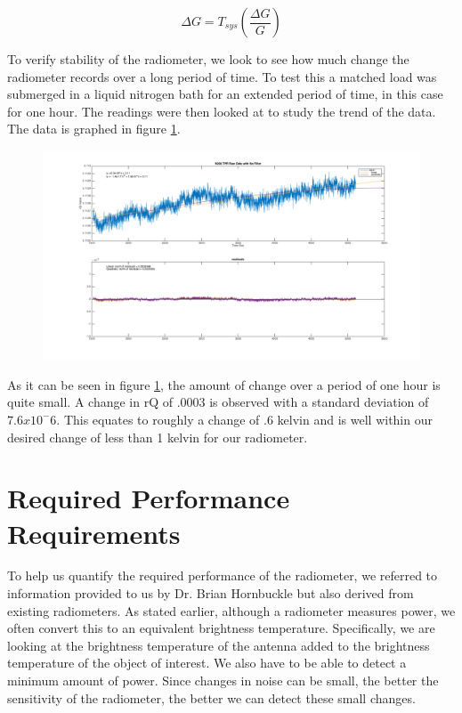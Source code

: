 \begin{equation} \label{eq:rad_stability}
\Delta G=T_{sys} \left(\frac{\Delta G}{G}\right)
\end{equation}

To verify stability of the radiometer, we look to see how much change the radiometer records over a long period of time.  To test this a matched load was submerged in a liquid nitrogen bath for an extended period of time, in this case for one hour.  The readings were then looked at to study the trend of the data.  The data is graphed in figure \ref{Stability}.

\begin{figure}[h!tb] \centering
\includegraphics[width=\textwidth]{Images/stability_test.png}
\label{Stability}
\end{figure}

As it can be seen in figure \ref{Stability}, the amount of change over a period of one hour is quite small.  A change in rQ of .0003 is observed with a standard deviation of $7.6 x 10^-6$.  This equates to roughly a change of .6 kelvin and is well within our desired change of less than 1 kelvin for our radiometer.

\section{Required Performance Requirements}

To help us quantify the required performance of the radiometer, we referred to information provided to us by Dr. Brian Hornbuckle but also derived from existing radiometers.  As stated earlier, although a radiometer measures power, we often convert this to an equivalent brightness temperature.  Specifically, we are looking at the brightness temperature of the antenna added to the brightness temperature of the object of interest.  We also have to be able to detect a minimum amount of power.  Since changes in noise can be small, the better the sensitivity of the radiometer, the better we can detect these small changes.  

